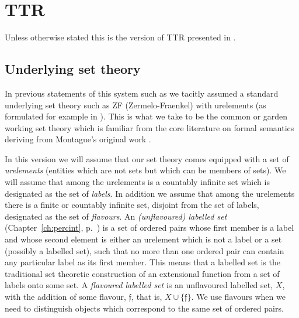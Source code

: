 \renewcommand{\thechapter}{}
\chapter{TTR}
\label{app:ttr}
\renewcommand{\thesection}{\arabic{section}}
Unless otherwise stated this is the version of TTR presented in 
\cite{Cooper2012}.

 \section{Underlying set theory}
 \label{app:sets}
In previous statements of this system such as \cite{Cooper2012} we
tacitly assumed a standard underlying set theory such as ZF
(Zermelo-Fraenkel) with urelements (as formulated for example in \citealp{Suppes1960}).  This is what we take to be the
common or garden working set theory which is familiar from the core
literature on formal semantics deriving from Montague's original work
\citep{Montague1974}.  

In this version we
will assume that our set theory comes equipped with a set of
\textit{urelements} (entities which are not sets but which can be
members of sets).  We will assume that among the urelements is a countably infinite
set which is designated as the set of \textit{labels}. In addition we assume
that among the urelements there is a finite or countably infinite set,
disjoint from the set of labels, designated as the set of
\textit{flavours}.  An \textit{(unflavoured) labelled set}
(Chapter~\ref{ch:percint}, p.~\pageref{sec:labelled-sets}) is a set
of ordered pairs whose first member is a label and whose second
element is either an urelement which is not a label or a set (possibly a labelled
set), such that no more than one ordered pair can contain any
particular label as its first member.  This means that a labelled set
is the traditional set theoretic construction of an extensional
function from a set of labels onto some set. A \textit{flavoured
labelled set} is an unflavoured labelled set, $X$, with the addition of
some flavour, $\mathfrak{f}$, that is, $X\cup\{\mathfrak{f}\}$. We use
flavours when we need to distinguish objects which correspond to the
same set of ordered pairs.

